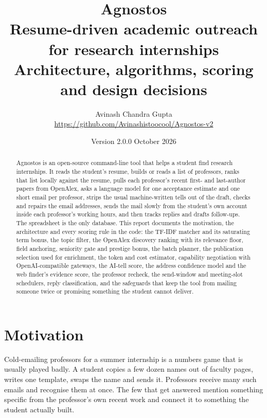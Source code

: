 \documentclass[11pt,a4paper]{article}
\title{\textbf{Agnostos}\\[4pt]\large Resume-driven academic outreach for research internships\\[2pt]
\normalsize Architecture, algorithms, scoring and design decisions}
\author{Avinash Chandra Gupta\\\small \url{https://github.com/Avinashistoocool/Agnostos-v2}}
\date{Version 2.0.0 \quad October 2026}
\begin{document}
\maketitle

\begin{abstract}
Agnostos is an open-source command-line tool that helps a student find research internships. It
reads the student's resume, builds or reads a list of professors, ranks that list locally against
the resume, pulls each professor's recent first- and last-author papers from OpenAlex, asks a
language model for one acceptance estimate and one short email per professor, strips the usual
machine-written tells out of the draft, checks and repairs the email addresses, sends the mail
slowly from the student's own account inside each professor's working hours, and then tracks
replies and drafts follow-ups. The spreadsheet is the only database. This report documents the
motivation, the architecture and every scoring rule in the code: the TF-IDF matcher and its
saturating term bonus, the topic filter, the OpenAlex discovery ranking with its relevance floor,
field anchoring, seniority gate and prestige bonus, the batch planner, the publication
selection used for enrichment, the token and cost estimator, capability negotiation with
OpenAI-compatible gateways, the AI-tell score, the address confidence model and the web finder's
evidence score, the professor recheck, the send-window and meeting-slot schedulers, reply
classification, and the safeguards that keep the tool from mailing someone twice or promising
something the student cannot deliver.
\end{abstract}

\tableofcontents
\newpage

\section{Motivation}

Cold-emailing professors for a summer internship is a numbers game that is usually played badly.
A student copies a few dozen names out of faculty pages, writes one template, swaps the name and
sends it. Professors receive many such emails and recognise them at once. The few that get
answered mention something specific from the professor's own recent work and connect it to
something the student actually built.
\end{document}
